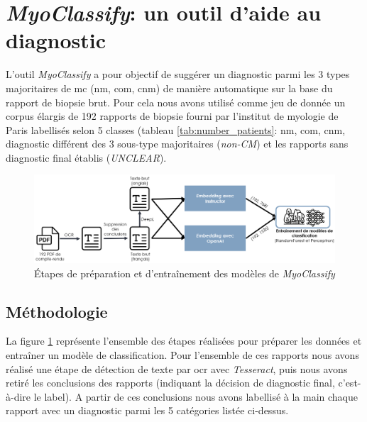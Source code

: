 \section{\textit{MyoClassify}: un outil d'aide au diagnostic}
L'outil \textit{MyoClassify} a pour objectif de suggérer un diagnostic parmi les 3 types majoritaires de \gls{mc} (\gls{nm}, \gls{com}, \gls{cnm}) de manière automatique sur la base du rapport de biopsie brut. Pour cela nous avons utilisé comme jeu de donnée un corpus élargis de 192 rapports de biopsie fourni par l'institut de myologie de Paris labellisés selon 5 classes (tableau \ref{tab:number_patients}: \gls{nm}, \gls{com}, \gls{cnm}, diagnostic différent des 3 sous-type majoritaires (\textit{non-CM}) et les rapports sans diagnostic final établis (\textit{UNCLEAR}).
\begin{figure}[htbp]
 \centering
 \includegraphics[width=1\textwidth]{figures/myoclassify_flow.png}
 \caption[Entraînement modèle \textit{MyoClassify}]{Étapes de préparation et d'entraînement des modèles de \textit{MyoClassify}}
 \label{fig:myoclassify_flow}
\end{figure}
\subsection{Méthodologie}
La figure \ref{fig:myoclassify_flow} représente l'ensemble des étapes réalisées pour préparer les données et entraîner un modèle de classification. Pour l'ensemble de ces rapports nous avons réalisé une étape de détection de texte par \gls{ocr} avec \textit{Tesseract}, puis nous avons retiré les conclusions des rapports (indiquant la décision de diagnostic final, c'est-à-dire le label). A partir de ces conclusions nous avons labellisé à la main chaque rapport avec un diagnostic parmi les 5 catégories listée ci-dessus.

